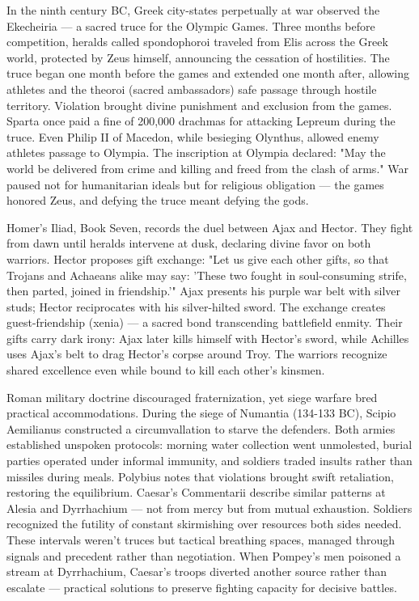 In the ninth century BC, Greek city-states perpetually at war observed the Ekecheiria — a sacred truce for the Olympic Games. Three months before competition, heralds called spondophoroi traveled from Elis across the Greek world, protected by Zeus himself, announcing the cessation of hostilities. The truce began one month before the games and extended one month after, allowing athletes and the theoroi (sacred ambassadors) safe passage through hostile territory. Violation brought divine punishment and exclusion from the games. Sparta once paid a fine of 200,000 drachmas for attacking Lepreum during the truce. Even Philip II of Macedon, while besieging Olynthus, allowed enemy athletes passage to Olympia. The inscription at Olympia declared: "May the world be delivered from crime and killing and freed from the clash of arms." War paused not for humanitarian ideals but for religious obligation — the games honored Zeus, and defying the truce meant defying the gods.

Homer's Iliad, Book Seven, records the duel between Ajax and Hector. They fight from dawn until heralds intervene at dusk, declaring divine favor on both warriors. Hector proposes gift exchange: "Let us give each other gifts, so that Trojans and Achaeans alike may say: 'These two fought in soul-consuming strife, then parted, joined in friendship.'" Ajax presents his purple war belt with silver studs; Hector reciprocates with his silver-hilted sword. The exchange creates guest-friendship (xenia) — a sacred bond transcending battlefield enmity. Their gifts carry dark irony: Ajax later kills himself with Hector's sword, while Achilles uses Ajax's belt to drag Hector's corpse around Troy. The warriors recognize shared excellence even while bound to kill each other's kinsmen. 

Roman military doctrine discouraged fraternization, yet siege warfare bred practical accommodations. During the siege of Numantia (134-133 BC), Scipio Aemilianus constructed a circumvallation to starve the defenders. Both armies established unspoken protocols: morning water collection went unmolested, burial parties operated under informal immunity, and soldiers traded insults rather than missiles during meals. Polybius notes that violations brought swift retaliation, restoring the equilibrium. Caesar's Commentarii describe similar patterns at Alesia and Dyrrhachium — not from mercy but from mutual exhaustion. Soldiers recognized the futility of constant skirmishing over resources both sides needed. These intervals weren't truces but tactical breathing spaces, managed through signals and precedent rather than negotiation. When Pompey's men poisoned a stream at Dyrrhachium, Caesar's troops diverted another source rather than escalate — practical solutions to preserve fighting capacity for decisive battles.

